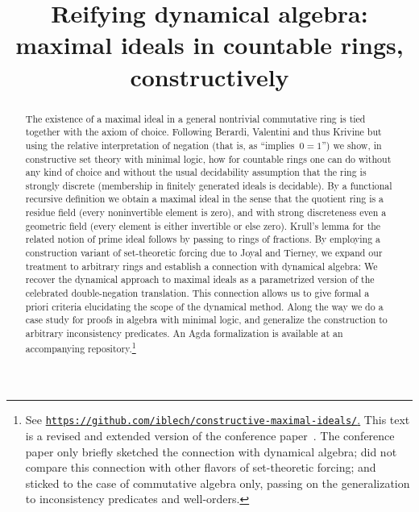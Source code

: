 \documentclass[com,11pt,crcready]{iosart2x}
\theoremstyle{definition}
\theoremstyle{plain}
\theoremstyle{remark}
\newcommand{\?}{\,{:}\,}
\renewcommand{\_}{\mathpunct{.}\,}
\begin{document}
\begin{frontmatter}

\title{Reifying dynamical algebra: \\ maximal ideals in countable rings, constructively}

\begin{aug}
\author[A]{
}
\author[B]{
}
\address[A]{Institut für Mathematik, ,
}
\address[B]{Dipartimento di Informatico, ,
}
\end{aug}

\begin{abstract}
  The existence of a maximal ideal in a general nontrivial commutative
  ring is tied together with the axiom of choice.
  Following Berardi, Valentini and thus Krivine but using the relative interpretation of
  negation (that is, as ``implies~$0=1$'') we show, in constructive set theory with
  minimal logic, how for countable rings one can do without any kind of choice
  and without the usual decidability assumption that the ring is strongly
  discrete (membership in finitely generated ideals is decidable).
  By a functional
  recursive definition we obtain a maximal ideal in the sense that the quotient ring is a residue field
  (every noninvertible element is zero), and with strong discreteness
  even a geometric field (every element is either invertible or
  else zero). Krull's lemma for the related notion of prime ideal follows by
  passing to rings of fractions.
  By employing a construction variant of set-theoretic forcing due to Joyal and
  Tierney, we expand our treatment to arbitrary rings and establish a
  connection with dynamical algebra: We
  recover the dynamical approach to maximal ideals as a parametrized version of the
  celebrated double-negation translation. This connection allows us to give formal a priori criteria
  elucidating the scope of the dynamical method.
  Along the way we do a case study for proofs in algebra with minimal logic,
  and generalize the construction to arbitrary inconsistency predicates. An Agda
  formalization is available at an accompanying repository.\footnote{See
  \href{https://github.com/iblech/constructive-maximal-ideals/}{\texttt{https:/$\!$/github.com/iblech/constructive-maximal-ideals/}.}
  This text is a revised and extended version
  of the conference paper~\cite{blechschmidt-schuster:constructive-maximal-ideals}. The conference paper only
  briefly sketched the connection with dynamical algebra; did not compare this
  connection with other flavors of set-theoretic forcing; and sticked to the case
  of commutative algebra only, passing on the generalization to inconsistency predicates
  and well-orders.}
\end{abstract}


\end{frontmatter}
\end{document}
